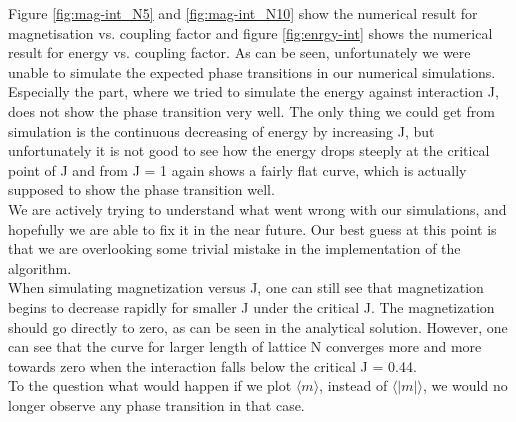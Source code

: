 \documentclass{article}
\begin{document}
Figure \ref{fig:mag-int_N5} and \ref{fig:mag-int_N10} show the numerical result for magnetisation vs. coupling factor and figure \ref{fig:enrgy-int} shows the numerical result for energy vs. coupling factor. As can be seen, unfortunately we were unable to simulate the expected phase transitions in our numerical simulations. Especially the part, where we tried to simulate the energy against interaction J, does not show the phase transition very well. The only thing we could get from simulation is the continuous decreasing of energy by increasing J, but unfortunately it is not good to see how the energy drops steeply at the critical point of J and from J = 1 again shows a fairly flat curve, which is actually supposed to show the phase transition well.\\
We are actively trying to understand what went wrong with our simulations, and hopefully we are able to fix it in the near future. Our best guess at this point is that we are overlooking some trivial mistake in the implementation of the algorithm. \\
When simulating magnetization versus J, one can still see that magnetization begins to decrease rapidly for smaller J under the critical J. The magnetization should go directly to zero, as can be seen in the analytical solution. However, one can see that the curve for larger length of lattice N converges more and more towards zero when the interaction falls below the critical J = 0.44. \\

To the question what would happen if we plot $\langle m \rangle$, instead of $\langle \vert m \vert \rangle$, we would no longer observe any phase transition in that case.
\end{document}
